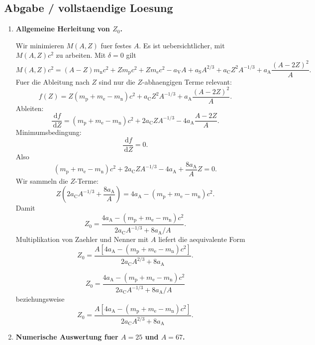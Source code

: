\documentclass[11pt,a4paper]{scrartcl}
\newcommand{\dd}{\,\mathrm{d}}
\newcommand{\dv}[2]{\frac{\dd #1}{\dd #2}}
\theoremstyle{definition}
\theoremstyle{plain}
\theoremstyle{remark}
\newcommand{\aV}{a_{\mathrm V}}
\newcommand{\aS}{a_{\mathrm S}}
\newcommand{\aC}{a_{\mathrm C}}
\newcommand{\aA}{a_{\mathrm A}}
\begin{document}
\subsection{Abgabe / vollstaendige Loesung}

\begin{enumerate}[label=(\alph*)]
    \item \textbf{Allgemeine Herleitung von $Z_0$.}

    \begin{calculationbox}
    Wir minimieren $M(A,Z)$ fuer festes $A$. Es ist uebersichtlicher, mit $M(A,Z)c^2$ zu arbeiten. Mit $\delta=0$ gilt
    \[
    M(A,Z)c^2=(A-Z)m_{\mathrm n}c^2+Z m_{\mathrm p}c^2+Z m_{\mathrm e}c^2
    -\aV A+\aS A^{2/3}+\aC Z^2 A^{-1/3}+\aA\frac{(A-2Z)^2}{A}.
    \]
    Fuer die Ableitung nach $Z$ sind nur die $Z$-abhaengigen Terme relevant:
    \[
        f(Z)=Z(m_{\mathrm p}+m_{\mathrm e}-m_{\mathrm n})c^2
        +\aC Z^2A^{-1/3}+\aA\frac{(A-2Z)^2}{A}.
    \]
    Ableiten:
    \[
        \dv{f}{Z}=(m_{\mathrm p}+m_{\mathrm e}-m_{\mathrm n})c^2
        +2\aC ZA^{-1/3}-4\aA\frac{A-2Z}{A}.
    \]
    Minimumsbedingung:
    \[
        \dv{f}{Z}=0.
    \]
    Also
    \[
        (m_{\mathrm p}+m_{\mathrm e}-m_{\mathrm n})c^2
        +2\aC ZA^{-1/3}-4\aA+\frac{8\aA}{A}Z=0.
    \]
    Wir sammeln die $Z$-Terme:
    \[
        Z\left(2\aC A^{-1/3}+\frac{8\aA}{A}\right)
        =4\aA-(m_{\mathrm p}+m_{\mathrm e}-m_{\mathrm n})c^2.
    \]
    Damit
    \[
        Z_0=\frac{4\aA-(m_{\mathrm p}+m_{\mathrm e}-m_{\mathrm n})c^2}
        {2\aC A^{-1/3}+8\aA/A}.
    \]
    Multiplikation von Zaehler und Nenner mit $A$ liefert die aequivalente Form
    \[
        Z_0=\frac{A\left[4\aA-(m_{\mathrm p}+m_{\mathrm e}-m_{\mathrm n})c^2\right]}
        {2\aC A^{2/3}+8\aA}.
    \]
    \end{calculationbox}

    \begin{answerbox}
    \[
        \boxed{Z_0=\frac{4\aA-(m_{\mathrm p}+m_{\mathrm e}-m_{\mathrm n})c^2}
        {2\aC A^{-1/3}+8\aA/A}}
    \]
    beziehungsweise
    \[
        \boxed{Z_0=\frac{A\left[4\aA-(m_{\mathrm p}+m_{\mathrm e}-m_{\mathrm n})c^2\right]}
        {2\aC A^{2/3}+8\aA}}.
    \]
    \end{answerbox}

    \item \textbf{Numerische Auswertung fuer $A=25$ und $A=67$.}


\end{enumerate}
\end{document}
